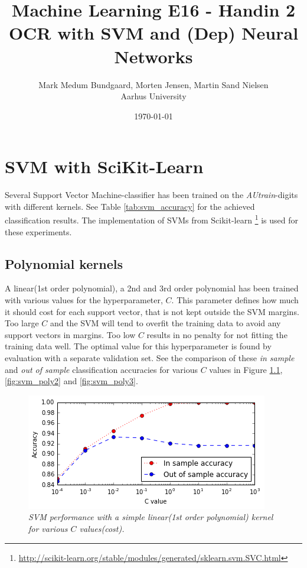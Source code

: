 \documentclass[a4paper,10pt,article,oneside,english]{memoir}
\let\oldcaption\caption
\renewcommand{\caption}[1]{\oldcaption{\emph{#1}}}
\begin{document}
	\title{Machine Learning E16 - Handin 2\\OCR with SVM and (Dep) Neural Networks}
	\author{Mark Medum Bundgaard, Morten Jensen, Martin Sand Nielsen\\ Aarhus University}
	\date{\today}
	
	\mainmatter
	\maketitle
	
	
	
	
	
	
	
	\chapter{SVM with SciKit-Learn}
	Several Support Vector Machine-classifier has been trained on the \emph{AUtrain}-digits with different kernels. See Table \ref{tab:svm_accuracy} for the achieved classification results. The implementation of SVMs from Scikit-learn  \footnote{ \url{http://scikit-learn.org/stable/modules/generated/sklearn.svm.SVC.html}}
	is used for these experiments.
	
	\section{Polynomial kernels}
	A linear(1st order polynomial), a 2nd and 3rd order polynomial has been trained with various values for the hyperparameter, $C$. This parameter defines how much it should cost for each support vector, that is not kept outside the SVM margins. Too large $C$ and the SVM will tend to overfit the training data to avoid any support vectors in margins. Too low $C$ results in no penalty for not fitting the training data well. The optimal value for this hyperparameter is found by evaluation with a separate validation set. See the comparison of these \emph{in sample} and \emph{out of sample} classification accuracies for various $C$ values in Figure \ref{fig:svm_lin}, \ref{fig:svm_poly2} and \ref{fig:svm_poly3}.
	
	
	\begin{figure}[h!]
		\centering
		\includegraphics[width=0.7\linewidth]{svm_lin.PNG}
		\caption{SVM performance with a simple linear(1st order polynomial) kernel for various $C$  values(cost).}
		\label{fig:svm_lin}
	\end{figure}
	
\end{document}
